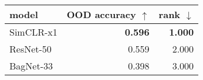 \begin{tabular}{lrr}
\toprule
    model & OOD accuracy $\uparrow$ & rank $\downarrow$ \\
\midrule
SimCLR-x1 &          \textbf{0.596} &    \textbf{1.000} \\
ResNet-50 &                   0.559 &             2.000 \\
BagNet-33 &                   0.398 &             3.000 \\
\bottomrule
\end{tabular}

